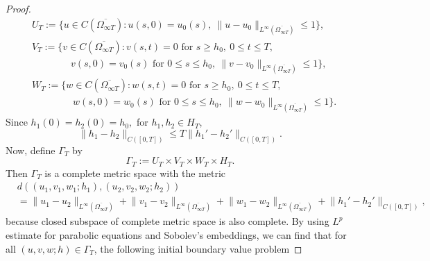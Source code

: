 \documentclass[11pt]{amsart}
\numberwithin{equation}{section}
\theoremstyle{plain}
\theoremstyle{definition}
\begin{document}
\begin{proof}
\begin{equation*}
\begin{aligned}
			&U_T :=\big\{u\in C(\overline{\Omega_{\infty T}}):u(s,0)=u_0(s),\ \lVert u-u_0 \rVert_{L^\infty(\overline{\Omega_{\infty T}})}\leq 1\big\},\\
			&V_T :=\big\{v \in C(\overline{\Omega_{\infty T}}):v(s,t)=0 \text{ for } s\geq h_0,\ 0 \leq t \leq T,\\
			&\qquad \qquad v(s,0)=v_0(s) \text{ for } 0\leq s \leq h_0,\ \lVert v-v_0 \rVert _{L^\infty(\overline{\Omega_{\infty T}})} \leq 1\big\},\\
			&W_T :=\big\{w \in C(\overline{\Omega_{\infty T}}):w(s,t)=0 \text{ for } s\geq h_0,\ 0 \leq t \leq T,\\
			&\qquad \qquad \ w(s,0)=w_0(s) \text{ for } 0\leq s \leq h_0,\ \lVert w-w_0 \rVert _{L^\infty(\overline{\Omega_{\infty T}})} \leq 1\big\}.
			\end{aligned}
		\end{equation*}
		Since $h_1(0)=h_2(0)=h_0,$ for $h_1,h_2 \in H_T$,
		\begin{equation} \label{h12}
			\lVert h_1-h_2 \rVert_{C([0,T])} \leq T \lVert h_1'-h_2'\rVert _{C([0,T])}.
		\end{equation}
		Now, define $\Gamma_T$ by
		\begin{equation*}
			\Gamma_T :=U_T \times V_T \times W_T \times H_T.
		\end{equation*}
		Then $\Gamma_T$ is a complete metric space with the metric
		\begin{equation*}
			\begin{aligned}
			&d((u_1,v_1,w_1;h_1),(u_2,v_2,w_2;h_2))\\
			&=\lVert u_1-u_2\rVert_{L^\infty(\overline{\Omega_{\infty T}})}+\lVert v_1-v_2\rVert_{L^\infty(\overline{\Omega_{\infty T}})}+\lVert w_1-w_2\rVert_{L^\infty(\overline{\Omega_{\infty T}})}+\lVert h_1'-h_2'\rVert_{C([0,T])},
			\end{aligned}
		\end{equation*}
		because closed subspace of complete metric space is also complete.
		By using $L^p$ estimate for parabolic equations and Sobolev's embeddings, we can find that for all $(u,v,w;h) \in \Gamma_T$, the following initial boundary value problem


\end{proof}
\end{document}
